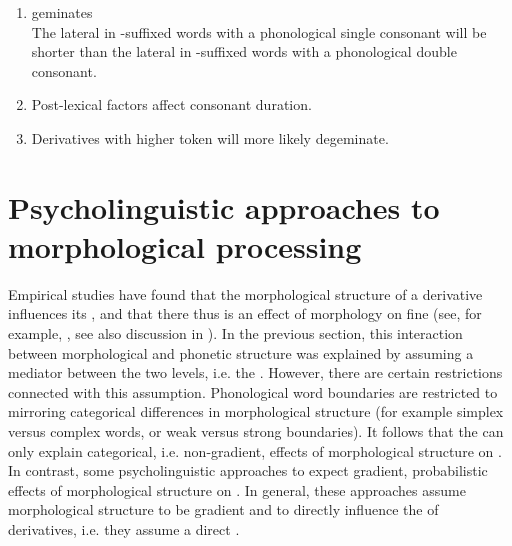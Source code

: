 \begin{enumerate}
	
	
	
	\item  {} geminates \\
	The lateral in -suffixed words with a phonological single consonant will be shorter than the lateral in -suffixed words with a phonological double consonant. 
	
	\item Post-lexical factors affect consonant duration.
	
	\item Derivatives with higher token  will more likely degeminate.
	
\end{enumerate}





\section{Psycholinguistic approaches to morphological processing} \label{Morphological Gemination: Implications for Psycholinguistic Theories of Morphological Processing}

Empirical studies have found that the morphological structure of a derivative influences its , and that there thus is an effect of morphology on fine  (see, for example, \citealt{Sproat.1993b, Cho.2001, Sugahara.2009, Pluymaekers.2010, Smith.2012, LeeKim.2013, Plag.2017}, see also discussion in ). 
In the previous section, this interaction between morphological and phonetic structure was explained by assuming a mediator between the two levels, i.e. the . However, there are certain restrictions connected with this assumption. Phonological word boundaries are restricted to mirroring categorical differences in morphological structure (for example simplex versus complex words, or weak versus strong boundaries). It follows that the  can only explain categorical, i.e. non-gradient, effects of morphological structure on . 
In contrast, some psycholinguistic approaches to  expect gradient, probabilistic effects of morphological structure on . In general, these approaches assume morphological structure to be gradient and to directly influence the  of derivatives, i.e. they assume a direct . 

